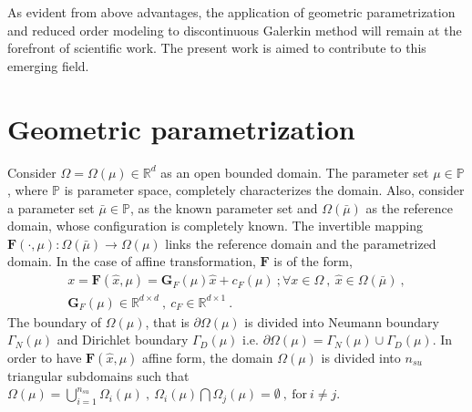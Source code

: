\documentclass[graybox]{svmult}
\begin{document}
As evident from above advantages, the application of geometric parametrization and reduced order modeling to discontinuous Galerkin method will remain at the forefront of scientific work. The present work is aimed to contribute to this emerging field. 

\section{Geometric parametrization}\label{geometric_parametrization_section}

Consider $\Omega = \Omega(\mu) \in \mathbb{R}^d$ as an open bounded domain. The parameter set $\mu \in \mathbb{P}$, where $\mathbb{P}$ is parameter space, completely characterizes the domain. Also, consider a parameter set $\bar{\mu} \in \mathbb{P}$, as the known parameter set and $\Omega(\bar{\mu})$ as the reference domain, whose configuration is completely known. The invertible mapping $\bm{F}(\cdot,\mu) : \Omega(\bar{\mu}) \rightarrow \Omega(\mu)$ links the reference domain and the parametrized domain. In the case of affine transformation, $\bm{F}$ is of the form,
\begin{equation}\label{affine_F}
\begin{split}
x = \bm{F}(\hat{x},\mu) = \bm{G}_F(\mu)\hat{x} + c_F(\mu) \ ; \forall x \in \Omega \ , \ \hat{x} \in \Omega(\bar{\mu}) \ , \\ \bm{G}_F(\mu) \in \mathbb{R}^{d \times d} \ , \ c_F \in \mathbb{R}^{d \times 1} \ .
\end{split}
\end{equation}
The boundary of $\Omega(\mu)$, that is $\partial \Omega(\mu)$ is divided into Neumann boundary $\Gamma_N(\mu)$ and Dirichlet boundary $\Gamma_D(\mu)$ i.e. $\partial \Omega(\mu) = \Gamma_N(\mu) \cup \Gamma_D(\mu)$. In order to have $\bm{F}(\hat{x},\mu)$ affine form, the domain $\Omega(\mu)$ is divided into $n_{su}$ triangular subdomains such that $\Omega(\mu) = \bigcup\limits_{i=1}^{n_{su}} \Omega_i(\mu) \ , \ \Omega_i(\mu) \bigcap \Omega_j(\mu) = \emptyset \ , \ \text{for} \ i \neq j$.
\end{document}
